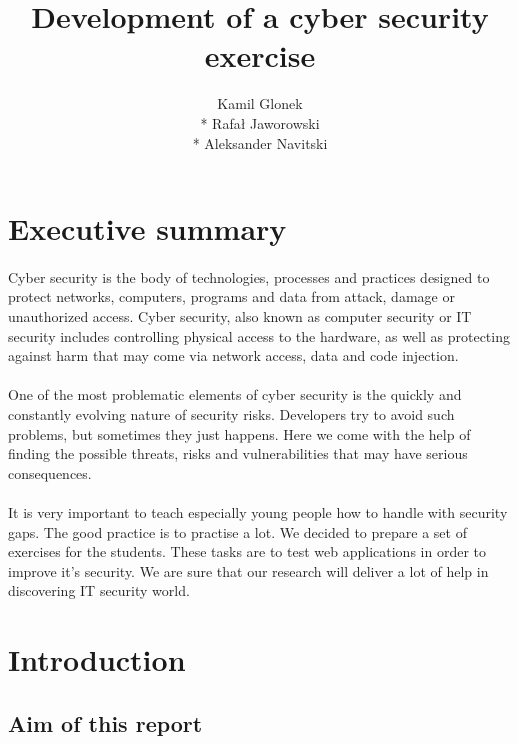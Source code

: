 \documentclass[12pt, a4paper]{article}
\title{Development of a cyber security exercise}
\author{Kamil Glonek \\* Rafał Jaworowski \\* Aleksander Navitski}
\begin{document}
\graphicspath{ {images/} }
\maketitle
\pagebreak
\section*{Executive summary}
	\paragraph{}Cyber security is the body of technologies, processes and practices designed to protect networks, computers, programs and data from attack, damage or unauthorized access. Cyber security, also known as computer security or IT security includes controlling physical access to the hardware, as well as protecting against harm that may come via network access, data and code injection.
	
	\paragraph{}One of the most problematic elements of cyber security is the quickly and constantly evolving nature of security risks. Developers try to avoid such problems, but sometimes they just happens. Here we come with the help of finding the possible threats, risks and vulnerabilities that may have serious consequences. 
	
	\paragraph{}It is very important to teach especially young people how to handle with security gaps. The good practice is to practise a lot. We decided to prepare a set of exercises for the students. These tasks are to test web applications in order to improve it's security. We are sure that our research will deliver a lot of help in discovering IT security world.

\pagebreak
\tableofcontents
\pagebreak
{}

\section{Introduction}
\subsection{Aim of this report}
\end{document}
